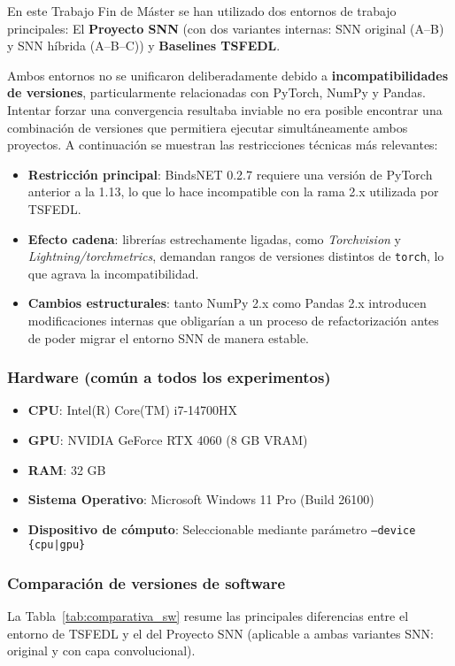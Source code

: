 En este Trabajo Fin de Máster se han utilizado dos entornos de trabajo principales:  El \textbf{Proyecto SNN} (con dos variantes internas: SNN original (A–B) y SNN híbrida (A–B–C)) y \textbf{Baselines TSFEDL}.

Ambos entornos no se unificaron deliberadamente debido a \textbf{incompatibilidades de versiones}, particularmente relacionadas con PyTorch, NumPy y Pandas. Intentar forzar una convergencia resultaba inviable no era posible encontrar una combinación de versiones que permitiera ejecutar simultáneamente ambos proyectos. A continuación se muestran las restricciones técnicas más relevantes:

\begin{itemize}
    \item \textbf{Restricción principal}: BindsNET 0.2.7 requiere una versión de PyTorch anterior a la 1.13, lo que lo hace incompatible con la rama 2.x utilizada por TSFEDL.
    \item \textbf{Efecto cadena}: librerías estrechamente ligadas, como \textit{Torchvision} y \textit{Lightning/torchmetrics}, demandan rangos de versiones distintos de \texttt{torch}, lo que agrava la incompatibilidad.
    \item \textbf{Cambios estructurales}: tanto NumPy 2.x como Pandas 2.x introducen modificaciones internas que obligarían a un proceso de refactorización antes de poder migrar el entorno SNN de manera estable.
\end{itemize}

\subsubsection*{Hardware (común a todos los experimentos)}
\begin{itemize}
    \item \textbf{CPU}: Intel(R) Core(TM) i7-14700HX
    \item \textbf{GPU}: NVIDIA GeForce RTX 4060 (8 GB VRAM)
    \item \textbf{RAM}: 32 GB
    \item \textbf{Sistema Operativo}: Microsoft Windows 11 Pro (Build 26100)
    \item \textbf{Dispositivo de cómputo}: Seleccionable mediante parámetro \texttt{--device \{cpu|gpu\}}
\end{itemize}

\subsubsection*{Comparación de versiones de software}
La Tabla~\ref{tab:comparativa_sw} resume las principales diferencias entre el entorno de TSFEDL y el del Proyecto SNN (aplicable a ambas variantes SNN: original y con capa convolucional).

